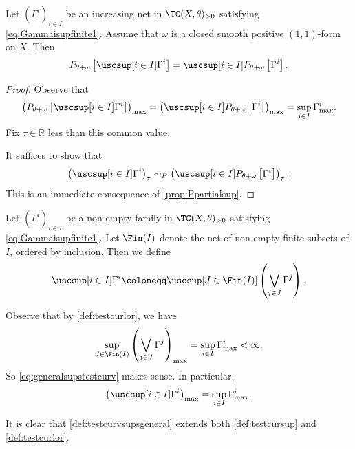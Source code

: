 \begin{lemma}\label{lma:suptestcurvcompatible}
    Let $(\Gamma^i)_{i\in I}$ be an increasing net in $\TC(X,\theta)_{>0}$ satisfying \eqref{eq:Gammaisupfinite1}. Assume that $\omega$ is a closed smooth positive $(1,1)$-form on $X$. Then
    \[
    P_{\theta+\omega}\left[ \uscsup[i\in I] \Gamma^{i} \right]= \uscsup[i\in I] P_{\theta+\omega}\left[ \Gamma^{i} \right].
    \]
\end{lemma}
\begin{proof}
    Observe that
    \[
    \left( P_{\theta+\omega}\left[ \uscsup[i\in I] \Gamma^{i} \right] \right)_{\max}= \left(\uscsup[i\in I] P_{\theta+\omega}\left[ \Gamma^{i} \right]\right)_{\max}=\sup_{i\in I}\Gamma^i_{\max}.
    \]
    Fix $\tau\in \mathbb{R}$ less than this common value.

    It suffices to show that
    \[
        \left( \uscsup[i\in I] \Gamma^{i} \right)_{\tau}\sim_P \left( \uscsup[i\in I] P_{\theta+\omega}\left[\Gamma^{i}\right] \right)_{\tau}.
    \]
    This is an immediate consequence of \cref{prop:Ppartialsup}.
\end{proof}

\begin{definition}\label{def:testcurvsupsgeneral}
    Let $(\Gamma^i)_{i\in I}$ be a non-empty family in $\TC(X,\theta)_{>0}$ satisfying \eqref{eq:Gammaisupfinite1}. Let $\Fin(I)$ denote the net of non-empty finite subsets of $I$, ordered by inclusion. Then we define
    \begin{equation}\label{eq:generalsupstestcurv}
    \uscsup[i\in I]\Gamma^i\coloneqq \uscsup[J\in \Fin(I)] \left( \bigvee_{j\in J} \Gamma^j\right).
    \end{equation}
\end{definition}

Observe that by \cref{def:testcurlor}, we have
\[
\sup_{J\in \Fin(I)} \left( \bigvee_{j\in J} \Gamma^j\right)_{\max}=\sup_{i\in I}\Gamma^i_{\max}<\infty.
\]
So \eqref{eq:generalsupstestcurv} makes sense. In particular,
\begin{equation}\label{eq:testcursupmax}
    \left(\uscsup[i\in I]\Gamma^i\right)_{\max}=\sup_{i\in I}\Gamma^i_{\max}.
\end{equation}

It is clear that \cref{def:testcurvsupsgeneral} extends both \cref{def:testcursup} and \cref{def:testcurlor}.

